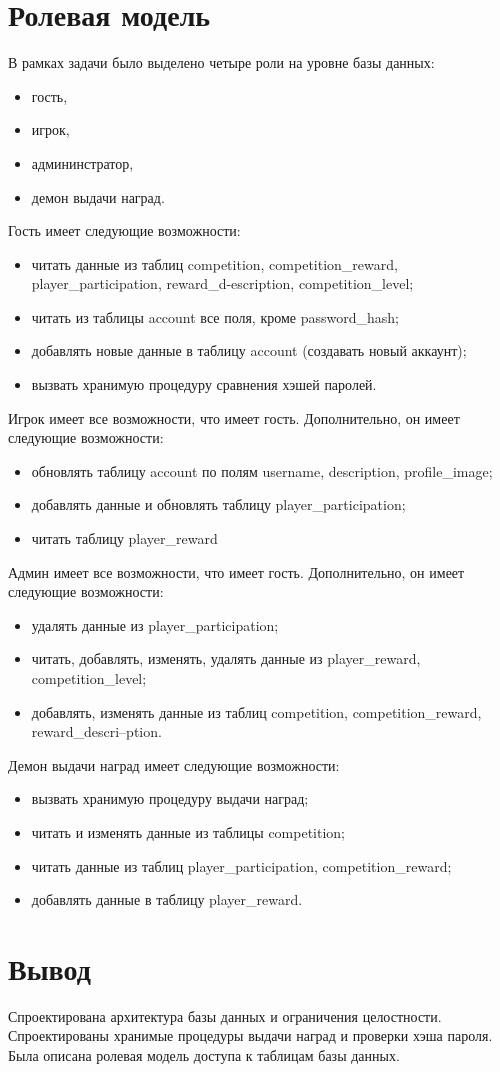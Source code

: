 \section{Ролевая модель}
В рамках задачи было выделено четыре роли на уровне базы данных:
\begin{itemize}
	\item гость,
	\item игрок,
	\item админинстратор,
	\item демон выдачи наград.
\end{itemize}
Гость имеет следующие возможности:
\begin{itemize}
	\item читать данные из таблиц competition, competition\_reward, player\_participation, reward\_d-escription, competition\_level;
	\item читать из таблицы account все поля, кроме password\_hash;
	\item добавлять новые данные в таблицу account (создавать новый аккаунт);
	\item вызвать хранимую процедуру сравнения хэшей паролей.
\end{itemize}
Игрок имеет все возможности, что имеет гость. Дополнительно, он имеет следующие возможности:
\begin{itemize}
	\item обновлять таблицу account по полям username, description, profile\_image;
	\item добавлять данные и обновлять таблицу player\_participation;
	\item читать таблицу player\_reward
\end{itemize}
Админ имеет все возможности, что имеет гость. Дополнительно, он имеет следующие возможности:
\begin{itemize}
	\item удалять данные из player\_participation;
	\item читать, добавлять, изменять, удалять данные из player\_reward, competition\_level;
	\item добавлять, изменять данные из таблиц competition, competition\_reward, reward\_descri--ption.
\end{itemize}
Демон выдачи наград имеет следующие возможности:
\begin{itemize}
	\item вызвать хранимую процедуру выдачи наград;
	\item читать и изменять данные из таблицы competition;
	\item читать данные из таблиц player\_participation, competition\_reward;
	\item добавлять данные в таблицу player\_reward.
\end{itemize}


\section*{Вывод}

Спроектирована архитектура базы данных и ограничения целостности. Спроектированы хранимые процедуры выдачи наград и проверки хэша пароля. Была описана ролевая модель доступа к таблицам базы данных.
\clearpage
